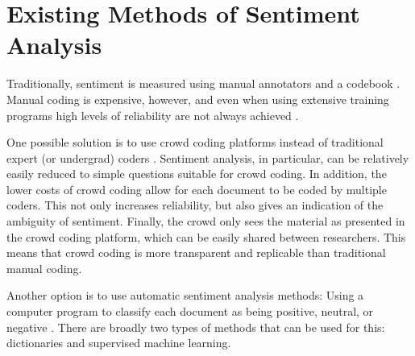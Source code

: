 \section{Existing Methods of Sentiment Analysis}

\noindent Traditionally, sentiment is measured using manual annotators and a codebook \citep[for examples, see][]{kleinnijenhuis2019combined,kleinnijenhuis2007test,meijer2006issue,cho2013campaign,shah2007campaign,aday2010chasing,elenbaas2008effects,natarajan2003asian,mccombes2000setting,martins2013content,nagel2012there,rodgers2003socialization,muddiman2017news,dunaway2015objectivity}. %
Manual coding is expensive, however, and even when using extensive training programs high levels of reliability are not always achieved \citep{weber18}.

One possible solution is to use crowd coding platforms instead of traditional expert (or undergrad) coders \citep{benoit16,haselmayer2017sentiment,lind2017content}.
Sentiment analysis, in particular, can be relatively easily reduced to simple questions suitable for crowd coding.
In addition, the lower costs of crowd coding allow for each document to be coded by multiple coders.
This not only increases reliability, but also gives an indication of the ambiguity of sentiment.
Finally, the crowd only sees the material as presented in the crowd coding platform, which can be easily shared between researchers.
This means that crowd coding is more transparent and replicable than traditional manual coding.

Another option is to use automatic sentiment analysis methods: 
Using a computer program to classify each document as being positive, neutral, or negative
\citep[for overviews of these methods, see][]{grimmer13,wilkerson2017large,welbers17,vanatteveldt2019studying,boumans16,hopkins2010method, nunez2016automated}. 
There are broadly two types of methods that can be used for this: dictionaries and supervised machine learning. 


